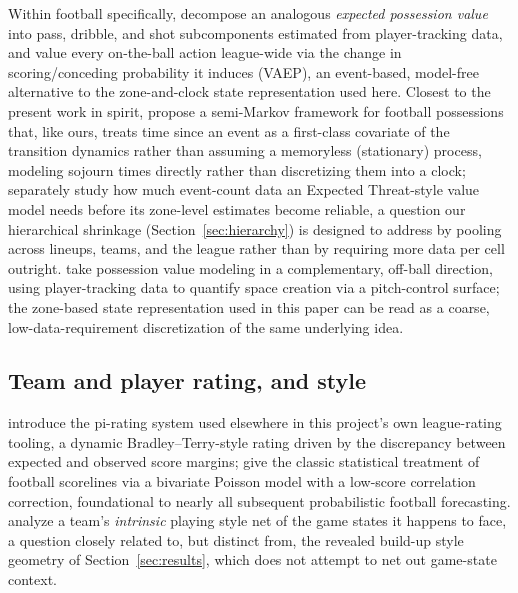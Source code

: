 \documentclass[11pt]{article}
\theoremstyle{plain}
\theoremstyle{definition}
\theoremstyle{remark}
\begin{document}
Within football specifically, \citet{fernandez2019decomposing} decompose an analogous \emph{expected possession value} into pass, dribble, and shot subcomponents estimated from player-tracking data, and \citet{decroos2019actions} value every on-the-ball action league-wide via the change in scoring/conceding probability it induces (VAEP), an event-based, model-free alternative to the zone-and-clock state representation used here. Closest to the present work in spirit, \citet{lecoz2026semimarkov} propose a semi-Markov framework for football possessions that, like ours, treats time since an event as a first-class covariate of the transition dynamics rather than assuming a memoryless (stationary) process, modeling sojourn times directly rather than discretizing them into a clock; \citet{vanarem2026modelquality} separately study how much event-count data an Expected Threat-style value model needs before its zone-level estimates become reliable, a question our hierarchical shrinkage (Section~\ref{sec:hierarchy}) is designed to address by pooling across lineups, teams, and the league rather than by requiring more data per cell outright. \citet{fernandez2018wideopenspaces} take possession value modeling in a complementary, off-ball direction, using player-tracking data to quantify space creation via a pitch-control surface; the zone-based state representation used in this paper can be read as a coarse, low-data-requirement discretization of the same underlying idea.

\subsection{Team and player rating, and style}
\citet{constantinou2013determining} introduce the pi-rating system used elsewhere in this project's own league-rating tooling, a dynamic Bradley--Terry-style rating driven by the discrepancy between expected and observed score margins; \citet{dixoncoles1997modelling} give the classic statistical treatment of football scorelines via a bivariate Poisson model with a low-score correlation correction, foundational to nearly all subsequent probabilistic football forecasting. \citet{clijmans2023looking} analyze a team's \emph{intrinsic} playing style net of the game states it happens to face, a question closely related to, but distinct from, the revealed build-up style geometry of Section~\ref{sec:results}, which does not attempt to net out game-state context.
\end{document}
